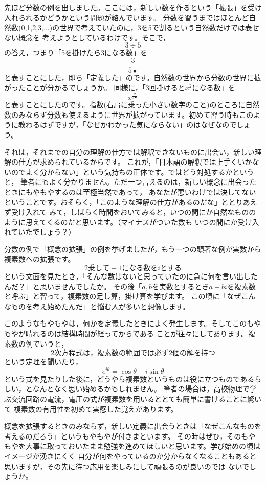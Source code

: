 \documentclass[./main]{subfiles}
\begin{document}
先ほど分数の例を出しました。ここには，新しい数を作るという「拡張」を受け入れられるかどうかという問題が絡んでいます。
分数を習うまではほとんど自然数(0,1,2,3,...)の世界で考えていたのに，3を5で割るという自然数だけでは表せない概念を
考えようとしているわけです。そこで，
\[
3 \div 5
\]
の答え，つまり「5を掛けたら3になる数」を
\[
\frac{3}{5•}
\]
と表すことにした，即ち「定義した」のです。自然数の世界から分数の世界に拡がったことが分かるでしょうか。
同様に，「3回掛けると$x^2$になる数」を
\[
x^{\frac{2}{3•}}
\]
と表すことにしたのです。指数(右肩に乗った小さい数字のこと)のところに自然数のみならず分数も使えるように世界が拡がっています。初めて習う時もこのように教わるはずですが，「なぜかわかった気にならない」のはなぜなのでしょう。

それは，それまでの自分の理解の仕方では解釈できないものに出会い，新しい理解の仕方が求められているからです。
これが，「日本語の解釈では上手くいかないのでよく分からない」という気持ちの正体です。ではどう対処するかというと，
筆者にもよく分かりません。ただ一つ言えるのは，新しい概念に出会ったときにもやもやするのは至極当然であって，
あなたが悪いわけでは決してないということです。おそらく，「このような理解の仕方があるのだな」ととりあえず受け入れて
みて，しばらく時間をおいてみると，いつの間にか自然なもののように思えてくるのだと思います。（マイナスがついた数も
いつの間にか受け入れていたでしょう？）


分数の例で「概念の拡張」の例を挙げましたが，もう一つの顕著な例が実数から複素数への拡張です。
\[ 2乗して-1になる数をiとする\]
という文面を見たとき，「そんな数はないと思っていたのに急に何を言い出したんだ？」と思いませんでしたか。
その後「$a,b$を実数とするとき$a+bi$を複素数と呼ぶ」と習って，複素数の足し算，掛け算を学びます。
この頃に「なぜこんなものを考え始めたんだ」と悩む人が多いと想像します。

このようなもやもやは，何かを定義したときによく発生します。そしてこのもやもやが晴れるのは結構時間が経ってからである
ことが往々にしてあります。複素数の例でいうと，
\[
2次方程式は，複素数の範囲では必ず2個の解を持つ
\]
という定理を聞いたり，
\[
e^{i \theta} = \cos \theta + i \sin \theta
\]
という式を見たりした後に，どうやら複素数というものは役に立つものであるらしい，となんとなく思い始めるかもしれません。
筆者の場合は，高校物理で学ぶ交流回路の電流，電圧の式が複素数を用いるととても簡単に書けることに驚いて
複素数の有用性を初めて実感した覚えがあります。

概念を拡張するときのみならず，新しい定義に出会うときは「なぜこんなものを考えるのだろう」というもやもやが付きまといます。
その時はぜひ，そのもやもやを大事に取っておいたまま勉強を進めてほしいと思います。学び始めの頃はイメージが湧きにくく
自分が何をやっているのか分からなくなることもあると思いますが，その先に待つ応用を楽しみにして頑張るのが良いのでは
ないでしょうか。
\end{document}
